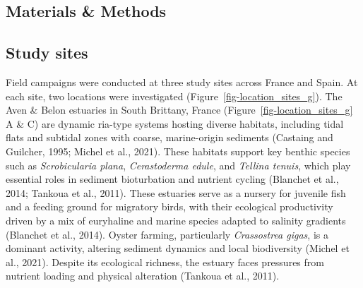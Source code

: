\documentclass[
  letterpaper,
  11pt,
  english,
  singlespacing,
  headsepline]{MastersDoctoralThesis}
\begin{document}
\begin{spacing}{1.5}
\section{Materials \& Methods}\label{materials-methods-1}

\subsection{Study sites}\label{study-sites-1}

Field campaigns were conducted at three study sites across France and
Spain. At each site, two locations were investigated
(Figure~\ref{fig-location_sites_g}). The Aven \& Belon estuaries in
South Brittany, France (Figure~\ref{fig-location_sites_g} A \& C) are
dynamic ria-type systems hosting diverse habitats, including tidal flats
and subtidal zones with coarse, marine-origin sediments (Castaing and
Guilcher, 1995; Michel et al., 2021). These habitats support key benthic
species such as \emph{Scrobicularia plana}, \emph{Cerastoderma edule},
and \emph{Tellina tenuis}, which play essential roles in sediment
bioturbation and nutrient cycling (Blanchet et al., 2014; Tankoua et
al., 2011). These estuaries serve as a nursery for juvenile fish and a
feeding ground for migratory birds, with their ecological productivity
driven by a mix of euryhaline and marine species adapted to salinity
gradients (Blanchet et al., 2014). Oyster farming, particularly
\emph{Crassostrea gigas}, is a dominant activity, altering sediment
dynamics and local biodiversity (Michel et al., 2021). Despite its
ecological richness, the estuary faces pressures from nutrient loading
and physical alteration (Tankoua et al., 2011).

\begin{figure}

\end{figure}
\end{spacing}
\end{document}
